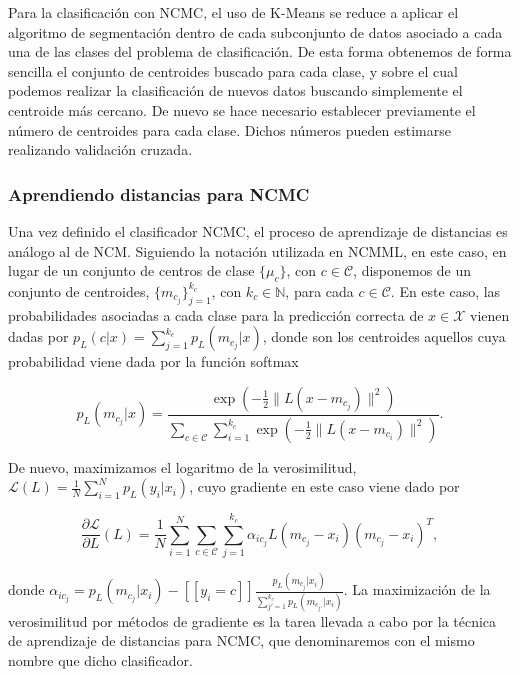 \documentclass{book}
\begin{document}
Para la clasificación con NCMC, el uso de K-Means se reduce a aplicar el algoritmo de segmentación dentro de cada subconjunto de datos asociado a cada una de las clases del problema de clasificación. De esta forma obtenemos de forma sencilla el conjunto de centroides buscado para cada clase, y sobre el cual podemos realizar la clasificación de nuevos datos buscando simplemente el centroide más cercano. De nuevo se hace necesario establecer previamente el número de centroides para cada clase. Dichos números pueden estimarse realizando validación cruzada. 


\subsubsection{Aprendiendo distancias para NCMC}

Una vez definido el clasificador NCMC, el proceso de aprendizaje de distancias es análogo al de NCM. Siguiendo la notación utilizada en NCMML, en este caso, en lugar de un conjunto de centros de clase $\{\mu_c\}$, con $c \in \mathcal{C}$, disponemos de un conjunto de centroides, $\{m_{c_j}\}_{j=1}^{k_c}$, con $k_c \in \mathbb{N}$, para cada $c \in \mathcal{C}$. En este caso, las probabilidades asociadas a cada clase para la predicción correcta de $x \in \mathcal{X}$ vienen dadas por $p_L(c|x) = \sum_{j=1}^{k_c} p_L(m_{c_j}|x)$, donde son los centroides aquellos cuya probabilidad viene dada por la función softmax

\begin{equation}
	p_L(m_{c_j}|x) = \frac{\exp\left( -\frac{1}{2} \|L(x-m_{c_j})\|^2 \right)}{ \sum\limits_{c \in \mathcal{C}} \sum\limits_{i=1}^{k_c} \exp\left( -\frac{1}{2} \|L(x-m_{c_i})\|^2 \right) }.
\end{equation}

De nuevo, maximizamos el logaritmo de la verosimilitud, $\mathcal{L}(L) = \frac{1}{N}\sum_{i=1}^N p_L(y_i|x_i)$, cuyo gradiente en este caso viene dado por

\begin{equation*}
	\frac{\partial \mathcal{L}}{\partial L}(L) = \frac{1}{N} \sum_{i=1}^N \sum_{c \in \mathcal{C}} \sum_{j=1}^{k_c} \alpha_{ic_j} L (m_{c_j}-x_i)(m_{c_j}-x_i)^T,
\end{equation*}

donde $\alpha_{ic_j} = p_L(m_{c_j}|x_i) - [\![ y_i = c ]\!] \frac{p_L(m_{c_j}|x_i)}{\sum_{j'=1}^{k_c} p_L(m_{c_{j'}}|x_i)}$. La maximización de la verosimilitud por métodos de gradiente es la tarea llevada a cabo por la técnica de aprendizaje de distancias para NCMC, que denominaremos con el mismo nombre que dicho clasificador.
\end{document}
